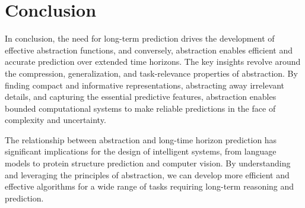 \documentclass[12pt]{article}
\begin{document}
\section{Conclusion}
In conclusion, the need for long-term prediction drives the development of effective abstraction functions, and conversely, abstraction enables efficient and accurate prediction over extended time horizons. The key insights revolve around the compression, generalization, and task-relevance properties of abstraction. By finding compact and informative representations, abstracting away irrelevant details, and capturing the essential predictive features, abstraction enables bounded computational systems to make reliable predictions in the face of complexity and uncertainty.

The relationship between abstraction and long-time horizon prediction has significant implications for the design of intelligent systems, from language models to protein structure prediction and computer vision. By understanding and leveraging the principles of abstraction, we can develop more efficient and effective algorithms for a wide range of tasks requiring long-term reasoning and prediction.



\end{document}
